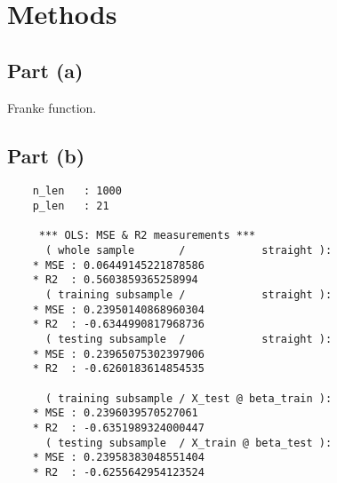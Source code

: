 
\section{Methods}

\subsection{Part (a)}
Franke function.

\subsection{Part (b)}

\begin{verbatim}
    n_len   : 1000
    p_len   : 21
    
     *** OLS: MSE & R2 measurements ***
      ( whole sample       /            straight ):
    * MSE : 0.06449145221878586
    * R2  : 0.5603859365258994
      ( training subsample /            straight ):
    * MSE : 0.23950140868960304
    * R2  : -0.6344990817968736
      ( testing subsample  /            straight ):
    * MSE : 0.23965075302397906
    * R2  : -0.6260183614854535
    
      ( training subsample / X_test @ beta_train ):
    * MSE : 0.2396039570527061
    * R2  : -0.6351989324000447
      ( testing subsample  / X_train @ beta_test ):
    * MSE : 0.23958383048551404
    * R2  : -0.6255642954123524
\end{verbatim}